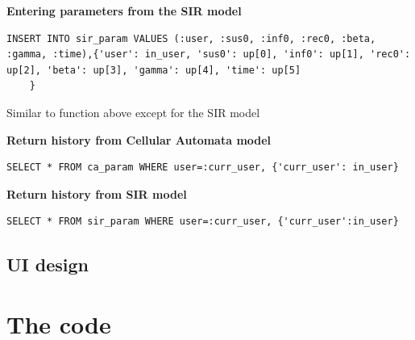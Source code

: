 \documentclass[11pt, a4paper]{article}
\begin{document}
\textbf{Entering parameters from the SIR model}
\begin{lstlisting}
INSERT INTO sir_param VALUES (:user, :sus0, :inf0, :rec0, :beta, :gamma, :time),{'user': in_user, 'sus0': up[0], 'inf0': up[1], 'rec0': up[2], 'beta': up[3], 'gamma': up[4], 'time': up[5]
    }
\end{lstlisting}
Similar to function above except for the SIR model

\textbf{Return history from Cellular Automata model}
\begin{lstlisting}
SELECT * FROM ca_param WHERE user=:curr_user, {'curr_user': in_user}
\end{lstlisting}

\textbf{Return history from SIR model}
\begin{lstlisting}
SELECT * FROM sir_param WHERE user=:curr_user, {'curr_user':in_user}
\end{lstlisting}



\subsection{UI design}

\newpage
\section{The code}

\end{document}
